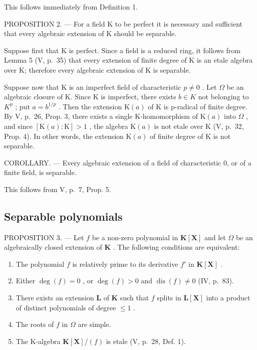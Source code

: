 This follows immediately from Definition 1.

PROPOSITION 2. --- For a field K to be perfect it is necessary and sufficient that every algebraic extension of K should be separable.

Suppose first that K is perfect. Since a field is a reduced ring, it follows from Lemma 5 (V, p.~35) that every extension of finite degree of K is an etale algebra over K; therefore every algebraic extension of K is separable.

Suppose now that K is an imperfect field of characteristic \(p \neq 0\) . Let \(\Omega\) be an algebraic closure of K. Since K is imperfect, there exists \(b \in K\) not belonging to \(K^{p}\) ; put \(a = b^{1/p}\) . Then the extension \(\mathrm{K}(a)\) of K is p-radical of finite degree. By V, p.~26, Prop. 3, there exists a single K-homomorphism of \(\mathrm{K}(a)\) into \(\Omega\) , and since \([\mathrm{K}(a):\mathrm{K}] > 1\) , the algebra \(\mathrm{K}(a)\) is not etale over K (V, p.~32, Prop. 4). In other words, the extension \(\mathrm{K}(a)\) of finite degree of K is not separable.

COROLLARY. --- Every algebraic extension of a field of characteristic 0, or of a finite field, is separable.

This follows from V, p.~7, Prop. 5.

\subsection{Separable polynomials}

PROPOSITION 3. --- Let \(f\) be a non-zero polynomial in \(\mathbf{K}[\mathbf{X}]\) and let \(\Omega\) be an algebraically closed extension of \(\mathbf{K}\) . The following conditions are equivalent:

\begin{enumerate}
\def\labelenumi{\alph{enumi})}
\item
  The polynomial \(f\) is relatively prime to its derivative \(f'\) in \(\mathbf{K}[\mathbf{X}]\) .
\item
  Either \(\deg(f) = 0\) , or \(\deg(f) > 0\) and \(\operatorname{dis}(f) \neq 0\) (IV, p.~83).
\item
  There exists an extension \(\mathbf{L}\) of \(\mathbf{K}\) such that \(f\) splits in \(\mathbf{L}[\mathbf{X}]\) into a product of distinct polynomials of degree \(\leqslant 1\) .
\item
  The roots of \(f\) in \(\Omega\) are simple.
\item
  The K-algebra \(\mathbf{K}[\mathbf{X}] / (f)\) is etale (V, p.~28, Def. 1).
\end{enumerate}

